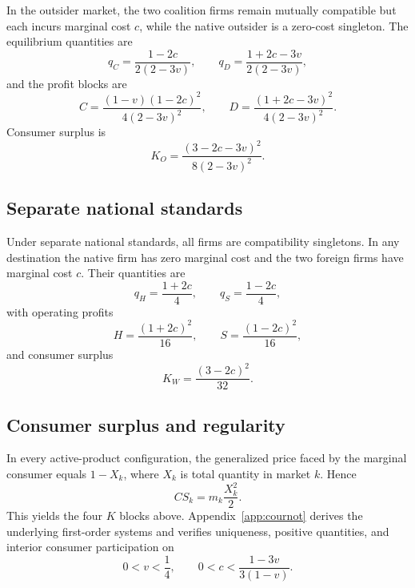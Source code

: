 In the outsider market, the two coalition firms remain mutually compatible but each incurs marginal cost $c$, while the native outsider is a zero-cost singleton. The equilibrium quantities are
\begin{equation}
    q_C=\frac{1-2c}{2(2-3v)},
    \qquad
    q_D=\frac{1+2c-3v}{2(2-3v)},
    \label{eq:quantities-su-outsider}
\end{equation}
and the profit blocks are
\begin{equation}
    C=\frac{(1-v)(1-2c)^2}{4(2-3v)^2},
    \qquad
    D=\frac{(1+2c-3v)^2}{4(2-3v)^2}.
    \label{eq:profits-su-outsider}
\end{equation}
Consumer surplus is
\begin{equation}
    K_O
    =\frac{(3-2c-3v)^2}{8(2-3v)^2}.
    \label{eq:KO}
\end{equation}

\subsection{Separate national standards}
\label{subsec:product-market-sw}

Under separate national standards, all firms are compatibility singletons. In any destination the native firm has zero marginal cost and the two foreign firms have marginal cost $c$. Their quantities are
\begin{equation}
    q_H=\frac{1+2c}{4},
    \qquad
    q_S=\frac{1-2c}{4},
    \label{eq:quantities-sw}
\end{equation}
with operating profits
\begin{equation}
    H=\frac{(1+2c)^2}{16},
    \qquad
    S=\frac{(1-2c)^2}{16},
    \label{eq:profits-sw}
\end{equation}
and consumer surplus
\begin{equation}
    K_W=\frac{(3-2c)^2}{32}.
    \label{eq:KW}
\end{equation}

\subsection{Consumer surplus and regularity}
\label{subsec:product-market-blocks}

In every active-product configuration, the generalized price faced by the marginal consumer equals $1-X_k$, where $X_k$ is total quantity in market $k$. Hence
\begin{equation}
    CS_k
    =m_k\frac{X_k^2}{2}.
    \label{eq:consumer-surplus-general}
\end{equation}
This yields the four $K$ blocks above. Appendix~\ref{app:cournot} derives the underlying first-order systems and verifies uniqueness, positive quantities, and interior consumer participation on
\[
0<v<\frac14,
\qquad
0<c<\frac{1-3v}{3(1-v)}.
\]

